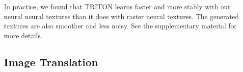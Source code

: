 \documentclass{article}
\begin{document}
		
		In practice, we found that TRITON learns faster and more stably with our neural neural textures than it does with raster neural textures. The generated textures are also smoother and less noisy. See the supplementary material for more details.





	\subsection{Image Translation}
	\label{sec:image_translation}



\end{document}
